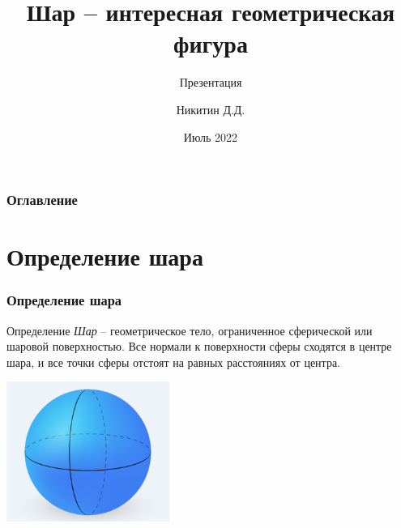 \documentclass[xcolor=table, t]{beamer}
\title[Шар]{Шар -- интересная геометрическая фигура}
\subtitle{Презентация}
\author[Никитин Д.Д.]{
	Никитин Д.Д. }
\institute[]{Факультет Компьютерных Наук \\ НИУ ВШЭ}
\date{Июль 2022}
\begin{document}
\begin{frame}
\maketitle
\end{frame}



\begin{frame}
\frametitle{Оглавление}
\tableofcontents
\end{frame}

\section{Определение шара}
\begin{frame}
    \frametitle<presentation>{Определение шара}
    \begin{block}{Определение}
    \textit{Шар} -- геометрическое тело, ограниченное сферической или шаровой  поверхностью. Все нормали к поверхности сферы сходятся в центре шара, и все точки сферы отстоят на равных расстояниях от центра. \cite{dictionary1890efrona}
    \end{block}
    \includegraphics[width=0.4\textwidth]{Шар.png}
\end{frame}


\end{document}
